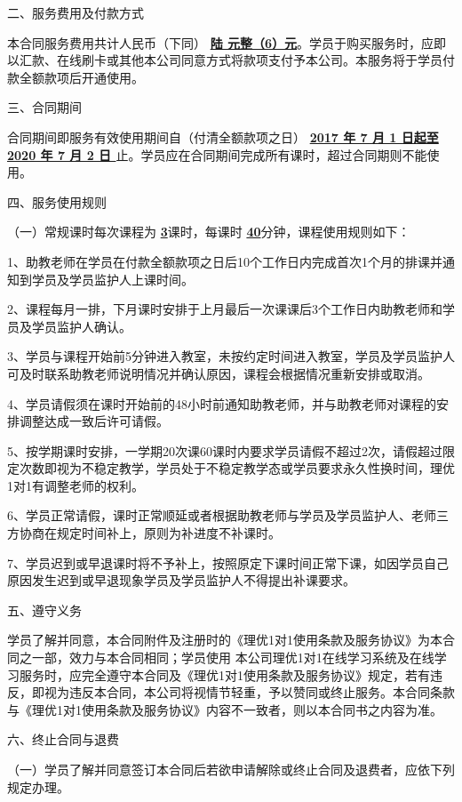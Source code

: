 \documentclass {ctexart}
\begin{document}
二、服务费用及付款方式


本合同服务费用共计人民币（下同）  \textbf{\underline{ 陆  元整（6）元}}。学员于购买服务时，应即以汇款、在线刷卡或其他本公司同意方式将款项支付予本公司。本服务将于学员付款全额款项后开通使用。



三、合同期间



合同期间即服务有效使用期间自（付清全额款项之日） \textbf{\underline{ 2017  年 7 月 1 日起至    2020 年 7  月  2 日 }} 止。学员应在合同期间完成所有课时，超过合同期则不能使用。


四、服务使用规则


（一）常规课时每次课程为 \underline{\textbf{ 3}}课时，每课时 \underline{\textbf{40}}分钟，课程使用规则如下：


1、助教老师在学员在付款全额款项之日后10个工作日内完成首次1个月的排课并通知到学员及学员监护人上课时间。


2、课程每月一排，下月课时安排于上月最后一次课课后3个工作日内助教老师和学员及学员监护人确认。


3、学员与课程开始前5分钟进入教室，未按约定时间进入教室，学员及学员监护人可及时联系助教老师说明情况并确认原因，课程会根据情况重新安排或取消。


4、学员请假须在课时开始前的48小时前通知助教老师，并与助教老师对课程的安排调整达成一致后许可请假。


5、按学期课时安排，一学期20次课60课时内要求学员请假不超过2次，请假超过限定次数即视为不稳定教学，学员处于不稳定教学态或学员要求永久性换时间，理优1对1有调整老师的权利。


6、学员正常请假，课时正常顺延或者根据助教老师与学员及学员监护人、老师三方协商在规定时间补上，原则为补进度不补课时。


7、学员迟到或早退课时将不予补上，按照原定下课时间正常下课，如因学员自己原因发生迟到或早退现象学员及学员监护人不得提出补课要求。



五、遵守义务


学员了解并同意，本合同附件及注册时的《理优1对1使用条款及服务协议》为本合同之一部，效力与本合同相同；学员使用 本公司理优1对1在线学习系统及在线学习服务时，应完全遵守本合同及《理优1对1使用条款及服务协议》规定，若有违反，即视为违反本合同，本公司将视情节轻重，予以赞同或终止服务。本合同条款与《理优1对1使用条款及服务协议》内容不一致者，则以本合同书之内容为准。


六、终止合同与退费


（一）学员了解并同意签订本合同后若欲申请解除或终止合同及退费者，应依下列规定办理。
\end{document}

